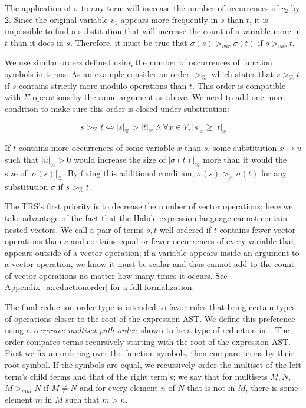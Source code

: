 \documentclass[sigplan,10pt,review,anonymous]{acmart}\settopmatter{printfolios=true,printccs=false,printacmref=false}
\begin{document}
 The application of $\sigma$ to any term will increase the number of occurrences of $v_2$ by 2. Since the original variable $v_1$ appears more frequently in $s$ than $t$, it is impossible to find a substitution that will increase the count of a variable more in $t$ than it does in $s$. Therefore, it must be true that $\sigma(s) >_{var} \sigma(t)$ if $s >_{var} t$.


We use similar orders defined using the number of occurrences of function symbols in terms. As an example consider an order $>_{\texttt{\%}}$ which states that $s >_{\texttt{\%}} t$ if $s$ contains strictly more modulo operations than $t$. This order is compatible with $\Sigma$-operations by the same argument as above. We need to add one more condition to make sure this order is closed under substitution:

\begin{equation*}
s >_{\texttt{\%}} t \iff |s|_{\texttt{\%}} > |t|_{\texttt{\%}} \wedge \forall x \in V, |s|_x \geq |t|_x
\end{equation*}

If $t$ contains more occurrences of some variable $x$ than $s$, some substitution $x \mapsto u$ such that $|u|_{\texttt{\%}} > 0$ would increase the size of $|\sigma(t)|_{\texttt{\%}}$ more than it would the size of $|\sigma(s)|_{\texttt{\%}}$. By fixing this additional condition, $\sigma(s) >_{\texttt{\%}} \sigma(t)$ for any substitution $\sigma$ if $s >_{\texttt{\%}} t$.

The TRS's first priority is to decrease the number of vector operations; here we take advantage of the fact that the Halide expression language cannot contain nested vectors. We call a pair of terms $s, t$ well ordered if $t$ contains fewer vector operations than $s$ and contains equal or fewer occurrences of every variable that appears outside of a vector operation; if a variable appears inside an argument to a vector operation, we know it must be scalar and thus cannot add to the count of vector operations no matter how many times it occurs. See Appendix~\ref{a:reductionorder} for a full formalization.

The final reduction order type is intended to favor rules that bring certain
types of operations closer to the root of the expression AST.
We define this preference using a \emph{recursive multiset path order}, shown to be a type of reduction in~\cite{baader1999term}. The order compares terms recursively starting with the root of the expression AST. First we
fix an ordering over the function symbols, then compare terms by their root
symbol. If the symbols are equal, we recursively order the multiset of the left
term's child terms and that of the right term's; we say that for multisets $M,
N$, $M >_{mul} N$ if $M \neq N$ and for every element $n$ of $N$ that is not in
$M$, there is some element $m$ in $M$ such that $m > n$.
\end{document}
